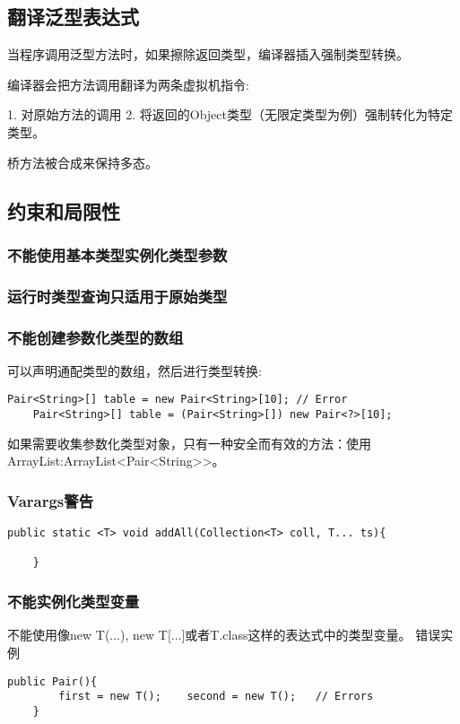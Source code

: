 \subsection{翻译泛型表达式}

当程序调用泛型方法时，如果擦除返回类型，编译器插入强制类型转换。

编译器会把方法调用翻译为两条虚拟机指令:

1. 对原始方法的调用
2. 将返回的Object类型（无限定类型为例）强制转化为特定类型。


桥方法被合成来保持多态。


\subsection{约束和局限性}

\subsubsection{不能使用基本类型实例化类型参数}

\subsubsection{运行时类型查询只适用于原始类型}

\subsubsection{不能创建参数化类型的数组}

可以声明通配类型的数组，然后进行类型转换:

\begin{lstlisting}[style=cjava,label=useless]
    Pair<String>[] table = new Pair<String>[10]; // Error
    Pair<String>[] table = (Pair<String>[]) new Pair<?>[10];
\end{lstlisting}

如果需要收集参数化类型对象，只有一种安全而有效的方法：使用ArrayList:ArrayList<Pair<String>>。


\subsubsection{Varargs警告}
\begin{lstlisting}[style=cjava,label=useless]
    public static <T> void addAll(Collection<T> coll, T... ts){

    }
\end{lstlisting}

\subsubsection{不能实例化类型变量}
 不能使用像new T(...), new T[...]或者T.class这样的表达式中的类型变量。
 错误实例
 \begin{lstlisting}[style=cjava,label=useless]
    public Pair(){
        first = new T();    second = new T();   // Errors
    }
 \end{lstlisting}


